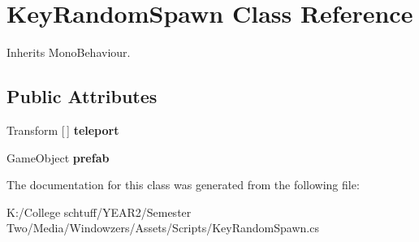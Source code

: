 \hypertarget{class_key_random_spawn}{}\section{Key\+Random\+Spawn Class Reference}
\label{class_key_random_spawn}


Inherits Mono\+Behaviour.

\subsection*{Public Attributes}
\begin{DoxyCompactItemize}
\item 
\mbox{\label{class_key_random_spawn_a34e30f777713ea99deed99b483c9c9b8}} 
Transform \mbox{[}$\,$\mbox{]} {\bfseries teleport}
\item 
\mbox{\label{class_key_random_spawn_a4336ce63379b6ddd62fb4d41cf8e4305}} 
Game\+Object {\bfseries prefab}
\end{DoxyCompactItemize}


The documentation for this class was generated from the following file\+:\begin{DoxyCompactItemize}
\item 
K\+:/\+College schtuff/\+Y\+E\+A\+R2/\+Semester Two/\+Media/\+Windowzers/\+Assets/\+Scripts/Key\+Random\+Spawn.\+cs\end{DoxyCompactItemize}
